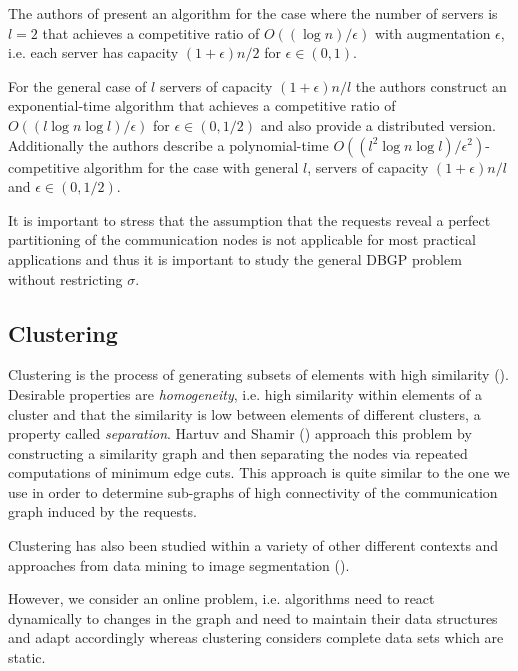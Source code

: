 \documentclass[a4paper, 10pt]{article}
\theoremstyle{definition}
\begin{document}
	The authors of \cite{Henzinger2019} present an algorithm for the case where the number of servers is $l=2$ that achieves a competitive ratio of $O((\log n)/\epsilon)$ with augmentation $\epsilon$, i.e. each server has capacity $(1+\epsilon)n/2$ for $\epsilon\in(0,1)$.
	
	For the general case of $l$ servers of capacity $(1+\epsilon)n/l$ the authors construct an exponential-time algorithm that achieves a competitive ratio of $O((l\log n \log l)/\epsilon)$ for $\epsilon\in(0,1/2)$ and also provide a distributed version.
	Additionally the authors describe a polynomial-time $O((l^2\log n\log l)/\epsilon^2)$-competitive algorithm for the case with general $l$, servers of capacity $(1+\epsilon)n/l$ and $\epsilon\in(0,1/2)$.
	
	It is important to stress that the assumption that the requests reveal a perfect partitioning of the communication nodes is not applicable for most practical applications and thus it is important to study the general DBGP problem without restricting $\sigma$.
	
	
	\subsection{Clustering}
	
	Clustering is the process of generating subsets of elements with high similarity (\cite{Hartuv2000}). Desirable properties are \textit{homogeneity}, i.e. high similarity within elements of a cluster and that the similarity is low between elements of different clusters, a property called \textit{separation}. Hartuv and Shamir (\cite{Hartuv2000}) approach this problem by constructing a similarity graph and then separating the nodes via repeated computations of minimum edge cuts. This approach is quite similar to the one we use in order to determine sub-graphs of high connectivity of the communication graph induced by the requests.
	
	Clustering has also been studied within a variety of other different contexts and approaches from data mining to image segmentation (\cite{Benabdellah2019, Wu1993, Pavana}).
	
	However, we consider an online problem, i.e. algorithms need to react dynamically to changes in the graph and need to maintain their data structures and adapt accordingly whereas clustering considers complete data sets which are static.
	
\end{document}
